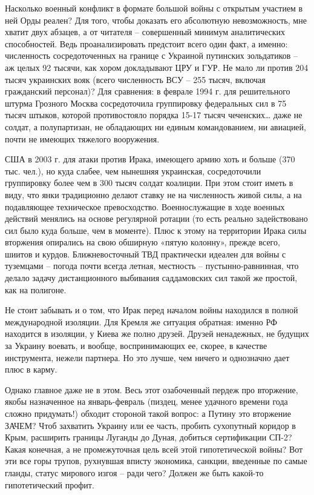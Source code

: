 Насколько военный конфликт в формате большой войны с открытым участием в ней
Орды реален? Для того, чтобы доказать его абсолютную невозможность, мне хватит
двух абзацев, а от читателя – совершенный минимум аналитических способностей.
Ведь проанализировать предстоит всего один факт, а именно: численность
сосредоточенных на границе с Украиной путинских зольдатиков – аж целых 92
тысячи, как хором докладывают ЦРУ и ГУР. Не мало ли против 204 тысяч украинских
вояк (всего численность ВСУ – 255 тысяч, включая гражданский персонал)? Для
сравнения: в феврале 1994 г. для решительного штурма Грозного Москва
сосредоточила группировку федеральных сил в 75 тысяч штыков, которой
противостояло порядка 15-17 тысяч чеченских… даже не солдат, а полупартизан, не
обладающих ни единым командованием, ни авиацией, почти не имеющих тяжелого
вооружения.

США в 2003 г. для атаки против Ирака, имеющего армию хоть и больше (370 тыс.
чел.), но куда слабее, чем нынешняя украинская, сосредоточили группировку более
чем в 300 тысяч солдат коалиции. При этом стоит иметь в виду, что янки
традиционно делают ставку не на численность живой силы, а на подавляющее
техническое превосходство. Военнослужащие в ходе военных действий менялись на
основе регулярной ротации (то есть реально задействовано сил было куда больше,
чем в моменте). Плюс к этому на территории Ирака силы вторжения опирались на
свою обширную «пятую колонну», прежде всего, шиитов и курдов. Ближневосточный
ТВД практически идеален для войны с туземцами – погода почти всегда летная,
местность – пустынно-равнинная, что делало задачу дистанционного выбивания
саддамовских сил такой же простой, как на полигоне.

Не стоит забывать и о том, что Ирак перед началом войны находился в полной
международной изоляции. Для Кремля же ситуация обратная: именно РФ находится в
изоляции, у Киева же полно друзей. Друзей ненадежных, не будущих за Украину
воевать, и вообще, воспринимающих ее, скорее, в качестве инструмента, нежели
партнера. Но это лучше, чем ничего и однозначно дает плюс в карму.

Однако главное даже не в этом. Весь этот озабоченный пердеж про вторжение,
якобы назначенное на январь-февраль (пиздец, менее удачного времени года сложно
придумать!) обходит стороной такой вопрос: а Путину это вторжение ЗАЧЕМ? Чтоб
захватить Украину или ее часть, пробить сухопутный коридор в Крым, расширить
границы Луганды до Дуная, добиться сертификации СП-2? Какая конечная, а не
промежуточная цель всей этой гипотетической войны? Вот эти все горы трупов,
рухнувшая вписту экономика, санкции, введенные по самые гланды, статус мирового
изгоя – ради чего? Должен же быть какой-то гипотетический профит.

